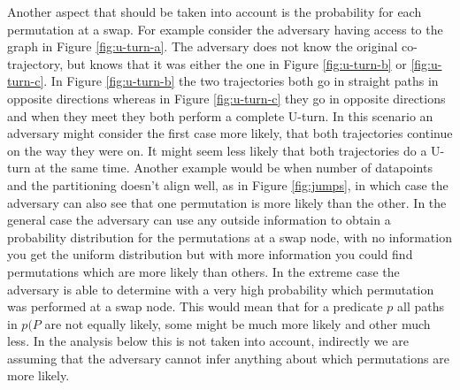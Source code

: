 \documentclass[12pt]{article}
\newcommand{\pred}{p}
\newcommand{\paths}{P}
\theoremstyle{definition}
\begin{document}
Another aspect that should be taken into account is the probability
for each permutation at a swap. For example consider the adversary
having access to the graph in Figure \ref{fig:u-turn-a}. The adversary
does not know the original co-trajectory, but knows that it was either
the one in Figure \ref{fig:u-turn-b} or \ref{fig:u-turn-c}. In Figure
\ref{fig:u-turn-b} the two trajectories both go in straight paths in
opposite directions whereas in Figure \ref{fig:u-turn-c} they go in
opposite directions and when they meet they both perform a complete
U-turn. In this scenario an adversary might consider the first case
more likely, that both trajectories continue on the way they were on.
It might seem less likely that both trajectories do a U-turn at the
same time. Another example would be when number of datapoints and the
partitioning doesn't align well, as in Figure \ref{fig:jumps}, in
which case the adversary can also see that one permutation is more
likely than the other. In the general case the adversary can use any
outside information to obtain a probability distribution for the
permutations at a swap node, with no information you get the uniform
distribution but with more information you could find permutations
which are more likely than others. In the extreme case the adversary
is able to determine with a very high probability which permutation
was performed at a swap node. This would mean that for a predicate
\(\pred\) all paths in \(\pred(\paths\) are not equally likely, some
might be much more likely and other much less. In the analysis below
this is not taken into account, indirectly we are assuming that the
adversary cannot infer anything about which permutations are more
likely.
\end{document}
